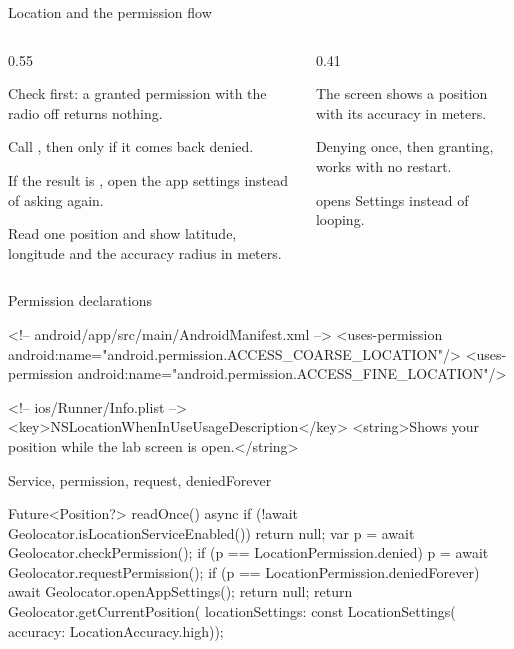 \documentclass[10pt,aspectratio=169,t]{beamer}
\begin{document}
\begin{frame}[eyebrow=Task II]{Location and the permission flow}
  \begin{columns}[T]
    \begin{column}{0.55\textwidth}
      \begin{steps}
        \item Check  first: a granted permission with the radio off returns nothing.
        \item Call , then  only if it comes back denied.
        \item If the result is , open the app settings instead of asking again.
        \item Read one position and show latitude, longitude and the accuracy radius in meters.
      \end{steps}
    \end{column}
    \begin{column}{0.41\textwidth}
      \begin{checklist}
        \item The screen shows a position with its accuracy in meters.
        \item Denying once, then granting, works with no restart.
        \item {} opens Settings instead of looping.
      \end{checklist}
    \end{column}
  \end{columns}
\end{frame}

\begin{frame}[fragile,eyebrow=Task II]{Permission declarations}
\begin{codeblock}[language=XML]
<!-- android/app/src/main/AndroidManifest.xml -->
<uses-permission android:name="android.permission.ACCESS_COARSE_LOCATION"/>
<uses-permission android:name="android.permission.ACCESS_FINE_LOCATION"/>

<!-- ios/Runner/Info.plist -->
<key>NSLocationWhenInUseUsageDescription</key>
<string>Shows your position while the lab screen is open.</string>
\end{codeblock}
\end{frame}

\begin{frame}[fragile,eyebrow=Task II]{Service, permission, request, deniedForever}
\begin{dart}
Future<Position?> readOnce() async {
  if (!await Geolocator.isLocationServiceEnabled()) return null;
  var p = await Geolocator.checkPermission();
  if (p == LocationPermission.denied) {
    p = await Geolocator.requestPermission();
  }
  if (p == LocationPermission.deniedForever) {
    await Geolocator.openAppSettings();
    return null;
  }
  return Geolocator.getCurrentPosition(
      locationSettings: const LocationSettings(
          accuracy: LocationAccuracy.high));
}
\end{dart}
\end{frame}
\end{document}
